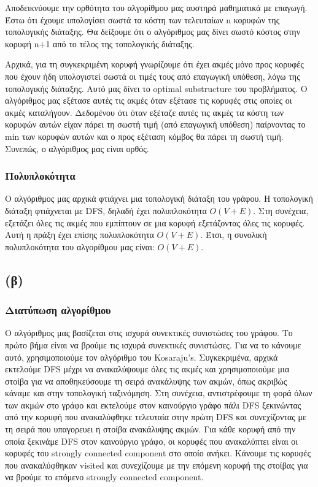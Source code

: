 \documentclass[a4paper,oneside, 11pt]{article}
\begin{document}
Αποδεικνύουμε την ορθότητα του αλγορίθμου μας αυστηρά μαθηματικά με επαγωγή. Έστω ότι έχουμε υπολογίσει σωστά τα κόστη των τελευταίων n κορυφών της τοπολογικής διάταξης. Θα δείξουμε ότι ο αλγόριθμος μας δίνει σωστό κόστος στην κορυφή n+1 από το τέλος της τοπολογικής διάταξης. \bigbreak 

Αρχικά, για τη συγκεκριμένη κορυφή γνωρίζουμε ότι έχει ακμές μόνο προς κορυφές που έχουν ήδη υπολογιστεί σωστά οι τιμές τους από επαγωγική υπόθεση, λόγω της τοπολογικής διάταξης. Αυτό μας δίνει το optimal substructure του προβλήματος. Ο αλγόριθμος μας εξέτασε αυτές τις ακμές όταν εξέτασε τις κορυφές στις οποίες οι ακμές καταλήγουν. Δεδομένου ότι όταν εξέταζε αυτές τις ακμές τα κόστη των κορυφών αυτών είχαν πάρει τη σωστή τιμή (από επαγωγική υπόθεση) παίρνοντας το min των κορυφών αυτών και ο προς εξέταση κόμβος θα πάρει τη σωστή τιμή. Συνεπώς, ο αλγόριθμος μας είναι ορθός.

\subsubsection{Πολυπλοκότητα}
Ο αλγόριθμος μας αρχικά φτιάχνει μια τοπολογική διάταξη του γράφου. Η τοπολογική διάταξη φτιάχνεται με DFS, δηλαδή έχει πολυπλοκότητα $O(V+E)$. Στη συνέχεια, εξετάζει όλες τις ακμές που εμπίπτουν σε μια κορυφή εξετάζοντας όλες τις κορυφές. Αυτή η πράξη έχει επίσης πολυπλοκότητα $O(V+E)$. Έτσι, η συνολική πολυπλοκότητα του αλγορίθμου μας είναι: $O(V+E)$.
\subsection*{(β)}

\subsubsection{Διατύπωση αλγορίθμου}
Ο αλγόριθμος μας βασίζεται στις ισχυρά συνεκτικές συνιστώσες του γράφου. Το πρώτο βήμα είναι να βρούμε τις ισχυρά συνεκτικές συνιστώσες. Για να το κάνουμε αυτό, χρησιμοποιούμε τον αλγόριθμο του Kosaraju's. Συγκεκριμένα, αρχικά εκτελούμε DFS μέχρι να ανακαλύψουμε όλες τις ακμές και χρησιμοποιούμε μια στοίβα για να αποθηκεύσουμε τη σειρά ανακάλυψης των ακμών, όπως ακριβώς κάναμε και στην τοπολογική ταξινόμηση. Στη συνέχεια, αντιστρέφουμε τη φορά όλων των ακμών στο γράφο και εκτελούμε στον καινούργιο γράφο πάλι DFS ξεκινώντας από την κορυφή που ανακαλύφθηκε τελευταία στην πρώτη DFS και συνεχίζοντας με τη σειρά που υπαγορευει η στοίβα ανακάλυψης ακμών. Για κάθε κορυφή από την οποία ξεκινάμε DFS στον καινούργιο γράφο, οι κορυφές που ανακαλύπτει είναι οι κορυφές του strongly connected component στο οποίο ανήκει. Κάνουμε τις κορυφές που ανακαλύφθηκαν visited και συνεχίζουμε με την επόμενη κορυφή της στοίβας για να βρούμε το επόμενο strongly connected component. \bigbreak 
\end{document}
